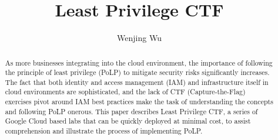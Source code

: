 \documentclass[sigconf]{acmart}
\begin{document}
\title{Least Privilege CTF}

\author{Wenjing Wu}




\begin{abstract}
 As more businesses integrating into the cloud environment, the importance of following the principle of least privilege (PoLP) to mitigate security risks significantly increases. The fact that both identity and access management (IAM) and infrastructure itself in cloud environments are sophisticated, and the lack of CTF (Capture-the-Flag) exercises pivot around IAM best practices make the task of understanding the concepts and following PoLP onerous. This paper describes Least Privilege CTF, a series of Google Cloud based labs that can be quickly deployed at minimal cost, to assist comprehension and illustrate the process of implementing PoLP.
\end{abstract}





\maketitle
\pagestyle{plain}
\end{document}
